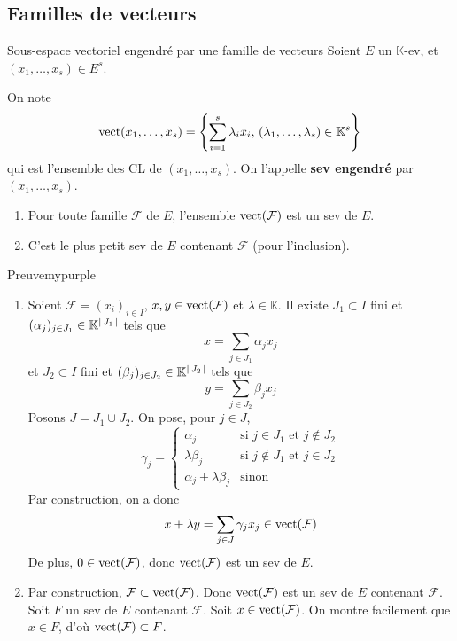 \subsection{Familles de vecteurs}

    \begin{defitheo}{Sous-espace vectoriel engendré par une famille de vecteurs}{}
        Soient $E$ un $\mathbb{K}$-ev, et $(x_1,\ldots,x_s) \in E^s$.

        On note 
        \[ \operatorname{vect}(x_1,\ldots,x_s) = \left\{ \sum\limits_{i=1}^s \lambda_i x_i, \, (\lambda_1,\ldots,\lambda_s) \in \mathbb{K}^s \right\} \] 
        qui est l’ensemble des CL de $(x_1,\ldots,x_s)$. On l’appelle \textbf{sev engendré} par $(x_1,\ldots,x_s)$.

        \begin{enumerate}
            \item Pour toute famille $\mathcal{F}$ de $E$, l’ensemble $\operatorname{vect}(\mathcal{F})$ est un sev de $E$.
            \item C’est le plus petit sev de $E$ contenant $\mathcal{F}$ (pour l’inclusion).
        \end{enumerate}
    \end{defitheo}

    \begin{demo}{Preuve}{mypurple}
        \begin{enumerate}
        \item Soient $\mathcal{F} = (x_i)_{i \in I}$, $x,y \in \operatorname{vect}(\mathcal{F})$ et $\lambda \in \mathbb{K}$. Il existe $J_1 \subset I$ fini et $(\alpha_j)_{j \in J_1} \in \mathbb{K}^{\left\lvert \,J_1 \, \right\rvert}$ tels que 
        \[ x = \sum_{j \in J_1} \alpha_j x_j \]
        et $J_2 \subset I$ fini et $(\beta_j)_{j \in J_2} \in \mathbb{K}^{\left\lvert \,J_2 \, \right\rvert}$ tels que 
        \[ y = \sum_{j \in J_2} \beta_j x_j \]
        Posons $J = J_1 \cup J_2$. On pose, pour $j \in J$,
        \[ \gamma_j = \left\{ 
            \begin{array}{cl}
                \alpha_j & \text{si } j \in J_1 \text{ et } j \notin J_2 \\
                \lambda \beta_j & \text{si } j \notin J_1 \text{ et } j \in J_2 \\
                \alpha_j + \lambda \beta_j & \text{sinon}
            \end{array}
         \right. \]
        Par construction, on a donc 
        \[ x+ \lambda y = \sum_{j \in J} \gamma_j x_j \in \operatorname{vect}(\mathcal{F}) \]
        De plus, $0 \in \operatorname{vect}(\mathcal{F})$, donc $\operatorname{vect}(\mathcal{F})$ est un sev de $E$.
        \item Par construction, $\mathcal{F} \subset \operatorname{vect}(\mathcal{F})$. Donc $\operatorname{vect}(\mathcal{F})$ est un sev de $E$ contenant $\mathcal{F}$. Soit $F$ un sev de $E$ contenant $\mathcal{F}$. Soit $x \in \operatorname{vect}(\mathcal{F})$. On montre facilement que $x \in F$, d’où $\operatorname{vect}(\mathcal{F}) \subset F$.
        \end{enumerate}
    \end{demo}

